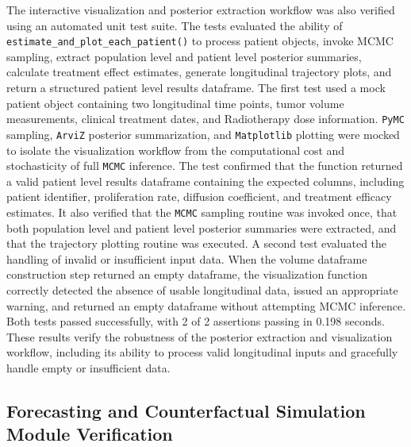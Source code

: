 The interactive visualization and posterior extraction workflow was also verified using an automated unit test suite. The tests evaluated the ability of \texttt{estimate\_and\_plot\_each\_patient()} to process patient objects, invoke MCMC sampling, extract population level and patient level posterior summaries, calculate treatment effect estimates, generate longitudinal trajectory plots, and return a structured patient level results dataframe. The first test used a mock patient object containing two longitudinal time points, tumor volume measurements, clinical treatment dates, and Radiotherapy dose information. \texttt{PyMC} sampling, \texttt{ArviZ} posterior summarization, and \texttt{Matplotlib} plotting were mocked to isolate the visualization workflow from the computational cost and stochasticity of full \texttt{MCMC} inference. The test confirmed that the function returned a valid patient level results dataframe containing the expected columns, including patient identifier, proliferation rate, diffusion coefficient, and treatment efficacy estimates. It also verified that the \texttt{MCMC} sampling routine was invoked once, that both population level and patient level posterior summaries were extracted, and that the trajectory plotting routine was executed. A second test evaluated the handling of invalid or insufficient input data. When the volume dataframe construction step returned an empty dataframe, the visualization function correctly detected the absence of usable longitudinal data, issued an appropriate warning, and returned an empty dataframe without attempting MCMC inference. Both tests passed successfully, with 2 of 2 assertions passing in 0.198 seconds. These results verify the robustness of the posterior extraction and visualization workflow, including its ability to process valid longitudinal inputs and gracefully handle empty or insufficient data.

\subsection{Forecasting and Counterfactual Simulation Module Verification}

